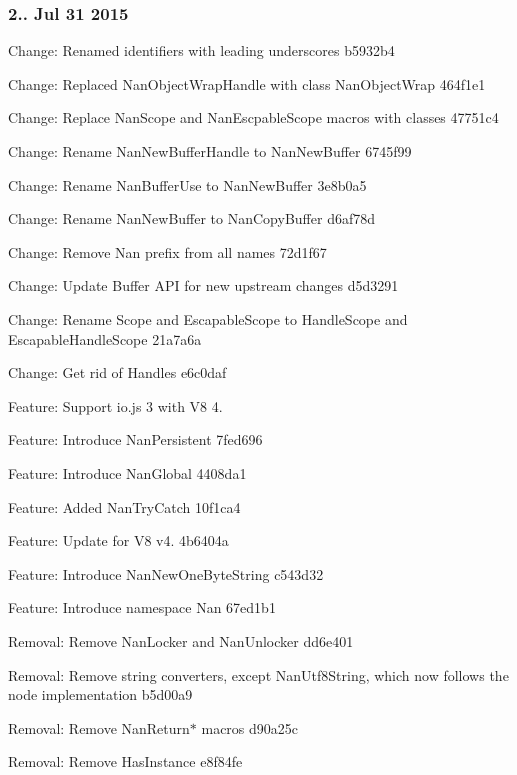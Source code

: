 \subsubsection*{2.. Jul 31 2015}


\begin{DoxyItemize}
\item Change\+: Renamed identifiers with leading underscores b5932b4
\item Change\+: Replaced Nan\+Object\+Wrap\+Handle with class Nan\+Object\+Wrap 464f1e1
\item Change\+: Replace Nan\+Scope and Nan\+Escpable\+Scope macros with classes 47751c4
\item Change\+: Rename Nan\+New\+Buffer\+Handle to Nan\+New\+Buffer 6745f99
\item Change\+: Rename Nan\+Buffer\+Use to Nan\+New\+Buffer 3e8b0a5
\item Change\+: Rename Nan\+New\+Buffer to Nan\+Copy\+Buffer d6af78d
\item Change\+: Remove Nan prefix from all names 72d1f67
\item Change\+: Update Buffer A\+PI for new upstream changes d5d3291
\item Change\+: Rename Scope and Escapable\+Scope to Handle\+Scope and Escapable\+Handle\+Scope 21a7a6a
\item Change\+: Get rid of Handles e6c0daf
\item Feature\+: Support io.\+js 3 with V8 4.
\item Feature\+: Introduce Nan\+Persistent 7fed696
\item Feature\+: Introduce Nan\+Global 4408da1
\item Feature\+: Added Nan\+Try\+Catch 10f1ca4
\item Feature\+: Update for V8 v4. 4b6404a
\item Feature\+: Introduce Nan\+New\+One\+Byte\+String c543d32
\item Feature\+: Introduce namespace Nan 67ed1b1
\item Removal\+: Remove Nan\+Locker and Nan\+Unlocker dd6e401
\item Removal\+: Remove string converters, except Nan\+Utf8\+String, which now follows the node implementation b5d00a9
\item Removal\+: Remove Nan\+Return$\ast$ macros d90a25c
\item Removal\+: Remove Has\+Instance e8f84fe
\end{DoxyItemize}

